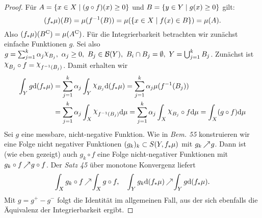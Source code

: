 \documentclass[skript.tex]{subfiles}
\begin{document}
	\begin{proof}
		Für $A = \left\{x\in X \mid (g\circ f)(x) \geq 0\right\}$ und $B = \left\{y \in Y \mid g(x) \geq 0\right\}$ gilt:
		\[
			(f_*\mu) (B) = \mu(f^{-1}(B)) = \mu(\left\{x\in X \mid f(x) \in B\right\}) = \mu(A).
		\]
		Also $(f_* \mu)(B^\mathrm{C}) = \mu(A^\mathrm{C})$. Für die Integrierbarkeit betrachten wir zunächst einfache Funktionen $g$. Sei also $g=\sum_{j=1}^k \alpha_j \rchi_{B_j},\ \alpha_j \geq 0,\ B_j \in \mc{B}(Y),\ B_i \cap B_j = \es,\ Y = \bigcup_{j=1}^k B_j$.  Zunächst ist $\rchi_{B_j} \circ f = \rchi_{f^{-1} (B_j)}$. Damit erhalten wir
		\begin{align*}
			\int_Y g \md (f_* \mu) &= \sum_{j=1}^{k} \alpha_j \int_Y \rchi_{B_j} \md(f_* \mu) = \sum_{j=1}^k \alpha_j \mu(f^{-1}(B_j)) \\ 
			&= \sum_{j=1}^k \alpha_j \int_X \rchi_{f^{-1}(B_j)} \md \mu = \sum_{j=1}^k \alpha_j \int_X \rchi_{B_j} \circ f \md \mu = \int_X (g\circ f) \md \mu
		\end{align*}
		Sei $g$ eine messbare, nicht-negative Funktion. Wie in \textit{Bem. 55} konstruieren wir eine Folge nicht negativer Funktionen $(g_k)_k \subset S(Y, f_*\mu)$ mit $g_k \kern -1pt \nearrow \kern -2pt g$. Dann ist (wie eben gezeigt) auch $g_k \circ f$ eine Folge nicht-negativer Funktionen mit $g_k \circ f \kern -1pt \nearrow \kern -2pt g\circ f$. Der \textit{Satz 45} über monotone Konvergenz liefert
		\[
			\int_X g_k \circ f \kern -1pt \nearrow \kern -2pt \int_X g\circ f,\quad \int_Y g_k \mathrm{d} (f_* \mu) \kern -1pt \nearrow \kern -2pt \int_Y g \mathrm{d} (f_* \mu).
		\]
		Mit $g = g^+ - g^-$ folgt die Identität im allgemeinen Fall, aus der sich ebenfalls die Äquivalenz der Integrierbarkeit ergibt.
\end{proof}
	
	
\end{document}
